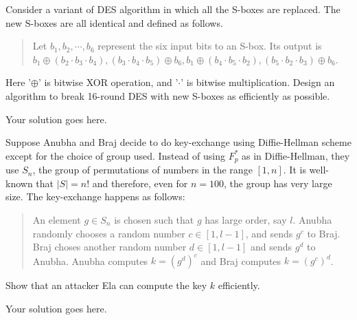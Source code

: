 \documentclass[12pt]{article}
\begin{document}
    \noindent
    
    \onehalfspace
    \thispagestyle{plain}

    \begin{question}
        Consider a variant of DES algorithm in which all the S-boxes are replaced. The new S-boxes are all identical and defined as follows.
        \begin{quote}
            Let $b_1, b_2, \cdots, b_6$ represent the six input bits to an S-box. Its output is $b_1 \oplus (b_2 \cdot b_3 \cdot b_4), (b_3 \cdot b_4 \cdot b_5) \oplus b_6, b_1 \oplus (b_4 \cdot b_5 \cdot b_2), (b_5 \cdot b_2 \cdot b_3) \oplus b_6$.
        \end{quote}
        Here '$\oplus$' is bitwise XOR operation, and '$\cdot$' is bitwise multiplication. Design an algorithm to break 16-round DES with new S-boxes as efficiently as possible.
    \end{question}
    \begin{solution}
        Your solution goes here.
    \end{solution}

    \begin{question}
        Suppose Anubha and Braj decide to do key-exchange using Diffie-Hellman scheme except for the choice of group used. Instead of using $F_{p}^{*}$ as in Diffie-Hellman, they use $S_n$, the group of permutations of numbers in the range $[1, n]$. It is well-known that $|S| = n!$ and therefore, even for $n = 100$, the group has very large size. The key-exchange happens as follows:
        \begin{quote}
            An element $g \in S_n$ is chosen such that $g$ has large order, say $l$. Anubha randomly chooses a random number $c \in [1, l - 1]$, and sends $g^c$ to Braj. Braj choses another random number $d \in [1, l - 1]$ and sends $g^d$ to Anubha. Anubha computes $k = (g^d)^c$ and Braj computes $k = (g^c)^d$.
        \end{quote}
        Show that an attacker Ela can compute the key $k$ efficiently.
    \end{question}
    
    \begin{solution}
        Your solution goes here.
    \end{solution}

    
    
\end{document}
